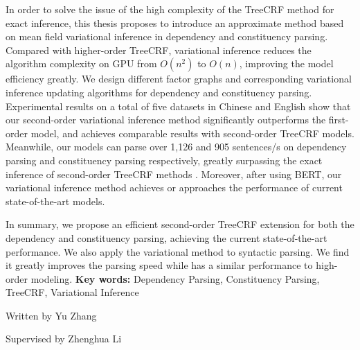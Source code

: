 \begin{eabstract}
\begin{enumerate}
          In order to solve the issue of the high complexity of the TreeCRF method for exact inference, this thesis proposes to introduce an approximate method based on mean field variational inference in dependency and constituency parsing.
          Compared with higher-order TreeCRF, variational inference reduces the algorithm complexity on GPU from $O(n^2)$ to $O(n)$, improving the model efficiency greatly.
          We design different factor graphs and corresponding variational inference updating algorithms for dependency and constituency parsing.
          Experimental results on a total of five datasets in Chinese and English show that our second-order variational inference method significantly outperforms the first-order model, and achieves comparable results with second-order TreeCRF models.
          Meanwhile, our models can parse over 1,126 and 905 sentences/s on dependency parsing and constituency parsing respectively, greatly surpassing the exact inference of second-order TreeCRF methods .
          Moreover, after using BERT, our variational inference method achieves or approaches the performance of current state-of-the-art models.
  \end{enumerate}

  In summary, we propose an efficient second-order TreeCRF extension for both the dependency and constituency parsing, achieving the current state-of-the-art performance.
  We also apply the variational method to syntactic parsing.
  We find it greatly improves the parsing speed while has a similar performance to high-order modeling.
  \vskip 21bp
    {\bf{} Key words: }
  Dependency Parsing,
  Constituency Parsing,
  TreeCRF,
  Variational Inference
\end{eabstract}

\begin{flushright}
  Written by Yu Zhang

  Supervised by Zhenghua Li
\end{flushright}
